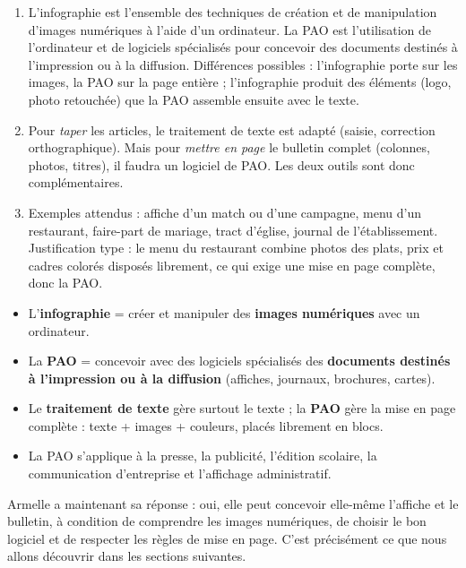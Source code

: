 \documentclass[11pt]{article}
\begin{document}
\begin{corrige}[Exercice]
\begin{enumerate}
\item L'infographie est l'ensemble des techniques de création et de manipulation d'images numériques à l'aide d'un ordinateur. La PAO est l'utilisation de l'ordinateur et de logiciels spécialisés pour concevoir des documents destinés à l'impression ou à la diffusion. Différences possibles : l'infographie porte sur les images, la PAO sur la page entière ; l'infographie produit des éléments (logo, photo retouchée) que la PAO assemble ensuite avec le texte.
\item Pour \emph{taper} les articles, le traitement de texte est adapté (saisie, correction orthographique). Mais pour \emph{mettre en page} le bulletin complet (colonnes, photos, titres), il faudra un logiciel de PAO. Les deux outils sont donc complémentaires.
\item Exemples attendus : affiche d'un match ou d'une campagne, menu d'un restaurant, faire-part de mariage, tract d'église, journal de l'établissement. Justification type : le menu du restaurant combine photos des plats, prix et cadres colorés disposés librement, ce qui exige une mise en page complète, donc la PAO.
\end{enumerate}
\end{corrige}

\begin{aretenir}
\begin{itemize}
\item L'\textbf{infographie} = créer et manipuler des \textbf{images numériques} avec un ordinateur.
\item La \textbf{PAO} = concevoir avec des logiciels spécialisés des \textbf{documents destinés à l'impression ou à la diffusion} (affiches, journaux, brochures, cartes).
\item Le \textbf{traitement de texte} gère surtout le texte ; la \textbf{PAO} gère la mise en page complète : texte + images + couleurs, placés librement en blocs.
\item La PAO s'applique à la presse, la publicité, l'édition scolaire, la communication d'entreprise et l'affichage administratif.
\end{itemize}
\end{aretenir}

Armelle a maintenant sa réponse : oui, elle peut concevoir elle-même l'affiche et le bulletin, à condition de comprendre les images numériques, de choisir le bon logiciel et de respecter les règles de mise en page. C'est précisément ce que nous allons découvrir dans les sections suivantes.
\end{document}
